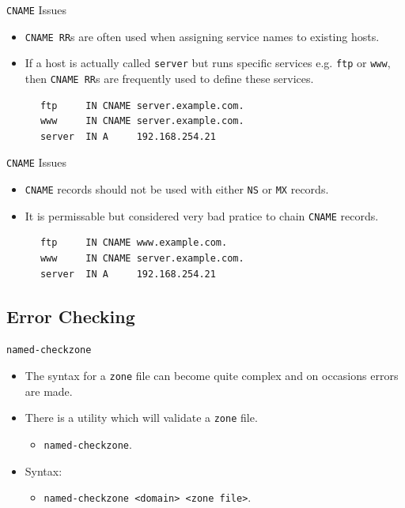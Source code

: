 \documentclass[aspectratio=169,xcolor=table]{beamer}
\begin{document}
\begin{frame}[fragile]{\texttt{CNAME} Issues}
  \begin{itemize}
    \item \texttt{CNAME RR}s are often used when assigning service names to existing hosts.
    \item If a host is actually called \texttt{server} but runs specific services e.g. \texttt{ftp} or \texttt{www}, then \texttt{CNAME RR}s are frequently used to define these services.
  \end{itemize}
  \begin{tcolorbox}
    \lstset{
      basicstyle=\scriptsize\ttfamily,
    }
    \begin{lstlisting}
      ftp     IN CNAME server.example.com.
      www     IN CNAME server.example.com.
      server  IN A     192.168.254.21
    \end{lstlisting}
  \end{tcolorbox}
\end{frame}

\begin{frame}[fragile]{\texttt{CNAME} Issues}
  \begin{itemize}
    \item \texttt{CNAME} records should not be used with either \texttt{NS} or \texttt{MX} records.
    \item It is permissable but considered very bad pratice to chain \texttt{CNAME} records.
  \end{itemize}
  \begin{tcolorbox}
    \lstset{
      basicstyle=\scriptsize\ttfamily,
    }
    \begin{lstlisting}
      ftp     IN CNAME www.example.com.
      www     IN CNAME server.example.com.
      server  IN A     192.168.254.21
    \end{lstlisting}
  \end{tcolorbox}
\end{frame}

\subsection{Error Checking}
\begin{frame}{\texttt{named-checkzone}}
  \begin{itemize}
    \item The syntax for a \texttt{zone} file can become quite complex and on occasions errors are made.
    \item There is a utility which will validate a \texttt{zone} file.
      \begin{itemize}
        \item \texttt{named-checkzone}.
      \end{itemize}
    \item Syntax:
      \begin{itemize}
        \item \texttt{named-checkzone <domain> <zone file>}.
      \end{itemize}
  \end{itemize}
\end{frame}
\end{document}
